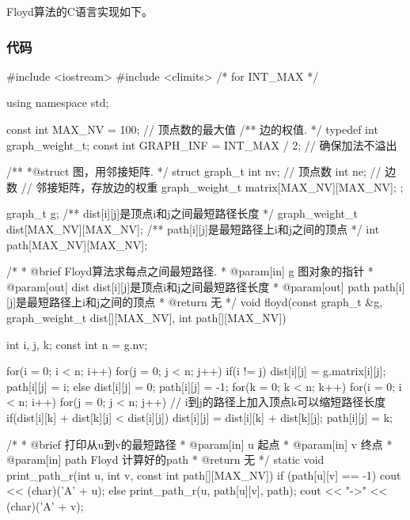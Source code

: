 Floyd算法的C语言实现如下。


\subsubsection{代码}

\begin{Codex}[label=am_graph_floyd.cpp]
#include <iostream>
#include <climits>  /* for INT_MAX */

using namespace std;

const int MAX_NV = 100; // 顶点数的最大值
/** 边的权值. */
typedef int graph_weight_t;
const int GRAPH_INF = INT_MAX / 2;   // 确保加法不溢出

/**
 *@struct 图，用邻接矩阵.
 */
struct graph_t {
    int nv; // 顶点数
    int ne; // 边数
    // 邻接矩阵，存放边的权重
    graph_weight_t matrix[MAX_NV][MAX_NV];
};


graph_t g;
/** dist[i][j]是顶点i和j之间最短路径长度 */
graph_weight_t dist[MAX_NV][MAX_NV];
/** path[i][j]是最短路径上i和j之间的顶点 */
int path[MAX_NV][MAX_NV];


/*
  * @brief Floyd算法求每点之间最短路径.
  * @param[in] g 图对象的指针
  * @param[out] dist dist[i][j]是顶点i和j之间最短路径长度
  * @param[out] path path[i][j]是最短路径上i和j之间的顶点
  * @return 无
  */
void floyd(const graph_t &g,
       graph_weight_t dist[][MAX_NV],
       int path[][MAX_NV]) {
    int i, j, k;
    const int n = g.nv;

    for(i = 0; i < n; i++) {
        for(j = 0; j < n; j++) {
            if(i != j) {
                dist[i][j] = g.matrix[i][j];
                path[i][j] = i;
            } else {
                dist[i][j] = 0;
                path[i][j] = -1;
            }
        }
    }
    for(k = 0; k < n; k++) {
        for(i = 0; i < n; i++) {
            for(j = 0; j < n; j++) {
                // i到j的路径上加入顶点k可以缩短路径长度
                if(dist[i][k] + dist[k][j] < dist[i][j]) {
                    dist[i][j] = dist[i][k] + dist[k][j];
                    path[i][j] = k;
                }
            }
        }
    }
}

/*
 * @brief 打印从u到v的最短路径
 * @param[in] u 起点
 * @param[in] v 终点
 * @param[in] path Floyd 计算好的path
 * @return 无
 */
static void print_path_r(int u, int v, const int path[][MAX_NV]) {
    if (path[u][v] == -1) {
        cout << (char)('A' + u);
    } else {
        print_path_r(u, path[u][v], path);
        cout << "->" << (char)('A' + v);
    }
}


\end{Codex}
